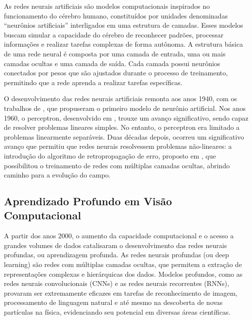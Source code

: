 As redes neurais artificiais são modelos computacionais inspirados no funcionamento do cérebro humano, constituídos por unidades denominadas ``neurônios artificiais'' interligados em uma estrutura de camadas. Esses modelos buscam simular a capacidade do cérebro de reconhecer padrões, processar informações e realizar tarefas complexas de forma autônoma. A estrutura básica de uma rede neural é composta por uma camada de entrada, uma ou mais camadas ocultas e uma camada de saída. Cada camada possui neurônios conectados por pesos que são ajustados durante o processo de treinamento, permitindo que a rede aprenda a realizar tarefas específicas.

O desenvolvimento das redes neurais artificiais remonta aos anos 1940, com os trabalhos de , que propuseram o primeiro modelo de neurônio artificial. Nos anos 1960, o perceptron, desenvolvido em , trouxe um avanço significativo, sendo capaz de resolver problemas lineares simples. No entanto, o perceptron era limitado a problemas linearmente separáveis. Duas décadas depois, ocorreu um significativo avanço que permitiu que redes neurais resolvessem problemas não-lineares: a introdução do algoritmo de retropropagação de erro, proposto em , que possibilitou o treinamento de redes com múltiplas camadas ocultas, abrindo caminho para a evolução do campo.


\subsection{Aprendizado Profundo em Visão Computacional}
\label{sec:dl-cv}
A partir dos anos 2000, o aumento da capacidade computacional e o acesso a grandes volumes de dados catalisaram o desenvolvimento das redes neurais profundas, ou aprendizagem profunda. As redes neurais profundas (ou deep learning) são redes com múltiplas camadas ocultas, que permitem a extração de representações complexas e hierárquicas dos dados. Modelos profundos, como as redes neurais convolucionais (CNNs) e as redes neurais recorrentes (RNNs), provaram ser extremamente eficazes em tarefas de reconhecimento de imagem, processamento de linguagem natural e até mesmo na descoberta de novas partículas na física, evidenciando seu potencial em diversas áreas científicas.

